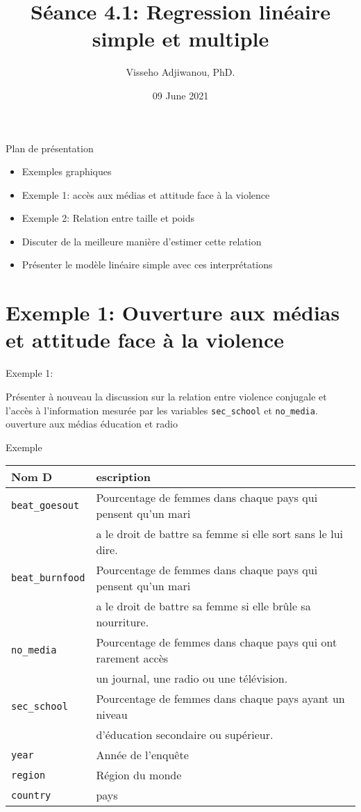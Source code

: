 \documentclass[ignorenonframetext,]{beamer}
\title{Séance 4.1: Regression linéaire simple et multiple}
\author{Visseho Adjiwanou, PhD.}
\institute{SICSS - Montréal}
\date{09 June 2021}
\providecommand{\tightlist}{%
  \setlength{\itemsep}{0pt}\setlength{\parskip}{0pt}}
\begin{document}
\frame{\titlepage}

\begin{frame}{Plan de présentation}

\begin{itemize}
\tightlist
\item
  Exemples graphiques
\item
  Exemple 1: accès aux médias et attitude face à la violence
\item
  Exemple 2: Relation entre taille et poids
\item
  Discuter de la meilleure manière d'estimer cette relation
\item
  Présenter le modèle linéaire simple avec ces interprétations
\end{itemize}

\end{frame}

\section{Exemple 1: Ouverture aux médias et attitude face à la
violence}\label{exemple-1-ouverture-aux-muxe9dias-et-attitude-face-uxe0-la-violence}

\begin{frame}[fragile]{Exemple 1:}

Présenter à nouveau la discussion sur la relation entre violence
conjugale et l'accès à l'information mesurée par les variables
\texttt{sec\_school} et \texttt{no\_media}. ouverture aux médias
éducation et radio

\end{frame}

\begin{frame}[fragile]{Exemple}

\begin{longtable}[]{@{}ll@{}}
\toprule
Nom D & escription\tabularnewline
\midrule
\endhead
\texttt{beat\_goesout} & Pourcentage de femmes dans chaque pays qui
pensent qu'un mari\tabularnewline
& a le droit de battre sa femme si elle sort sans le lui
dire.\tabularnewline
\texttt{beat\_burnfood} & Pourcentage de femmes dans chaque pays qui
pensent qu'un mari\tabularnewline
& a le droit de battre sa femme si elle brûle sa
nourriture.\tabularnewline
\texttt{no\_media} & Pourcentage de femmes dans chaque pays qui ont
rarement accès\tabularnewline
& un journal, une radio ou une télévision.\tabularnewline
\texttt{sec\_school} & Pourcentage de femmes dans chaque pays ayant un
niveau\tabularnewline
& d'éducation secondaire ou supérieur.\tabularnewline
\texttt{year} & Année de l'enquête\tabularnewline
\texttt{region} & Région du monde\tabularnewline
\texttt{country} & pays\tabularnewline
\bottomrule
\end{longtable}

\end{frame}
\end{document}
